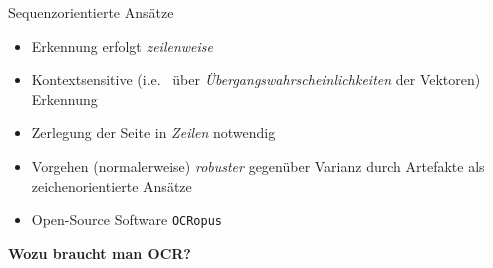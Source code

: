 \documentclass{bbawslides}
\begin{document}
\begin{bbawslide}{Sequenzorientierte Ansätze}
  \vspace*{7mm}%
  \centerslidestrue%
  \begin{minipage}{1.05\textwidth}
    \begin{itemize}
      \item Erkennung erfolgt \emph{zeilenweise}
    \end{itemize}
  \end{minipage}
  \begin{center}
  \end{center}
  \begin{minipage}{1.05\textwidth}
    \begin{itemize}
      \item Kontextsensitive (i.e.~ über \emph{Übergangswahrscheinlichkeiten} der Vektoren) Erkennung
      \item Zerlegung der Seite in \emph{Zeilen} notwendig
      \item Vorgehen (normalerweise) \emph{robuster} gegenüber Varianz durch Artefakte als zeichenorientierte Ansätze
      \item Open-Source Software \texttt{OCRopus} 
    \end{itemize}
  \end{minipage}
\end{bbawslide}

\begin{bbawpart}{\Large\bf Wozu braucht man OCR?}
\end{bbawpart}

\renewcommand{\footerText}{\tiny 4. August 2017, DH-Kolloquium, BBAW\hspace{4cm} Image by Achim Raschka, CC BY-SA 3.0}
\end{document}
